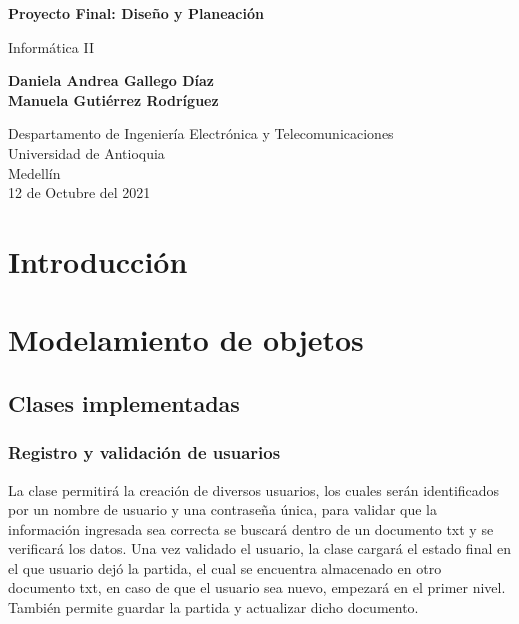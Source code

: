 \documentclass{article}
\begin{document}
\begin{titlepage}
    \begin{center}
        \vspace*{1cm}
            
        \Huge
        \textbf {Proyecto Final: Diseño y Planeación}
            
        \vspace{0.5cm}
        \LARGE
        Informática II
            
        \vspace{1.5cm}
            
        \textbf{Daniela Andrea Gallego Díaz\\ Manuela Gutiérrez Rodríguez }
            
        \vfill
            
        \vspace{0.8cm}
            
        \Large
        Despartamento de Ingeniería Electrónica y Telecomunicaciones\\
        Universidad de Antioquia\\
        Medellín\\
        12 de Octubre del 2021
            
    \end{center}
\end{titlepage}

\tableofcontents
\newpage

\section{Introducción} \label{Introducción}

\section{Modelamiento de objetos} \label{Modelamiento de objetos}

\subsection{Clases implementadas}

\subsubsection{Registro y validación de usuarios}

La clase permitirá la creación de diversos usuarios, los cuales serán identificados por un nombre de usuario y una contraseña única, para validar que la información ingresada sea correcta se buscará dentro de un documento txt y se verificará los datos. Una vez validado el usuario, la clase cargará el estado final en el que usuario dejó la partida, el cual se encuentra almacenado en otro documento txt, en caso de que el usuario sea nuevo, empezará en el primer nivel. También permite guardar la partida y actualizar dicho documento.
\end{document}
